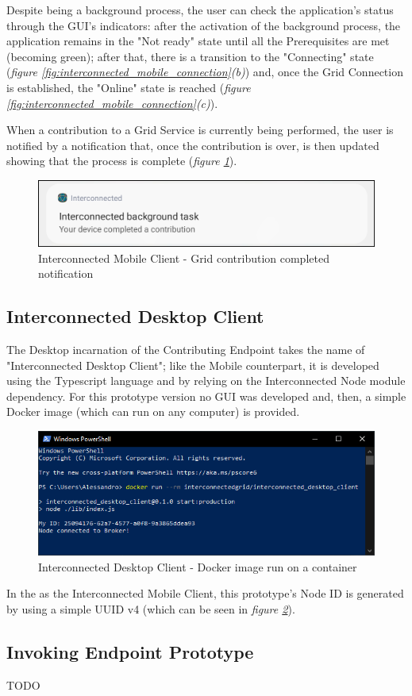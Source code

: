 \vspace{5mm}

Despite being a background process, the user can check the application's status through the GUI's indicators: after the activation of the background process, the application remains in the "Not ready" state until all the Prerequisites are met (becoming green); after that, there is a transition to the "Connecting" state (\textit{figure \ref{fig:interconnected_mobile_connection}(b)}) and, once the Grid Connection is established, the "Online" state is reached (\textit{figure \ref{fig:interconnected_mobile_connection}(c)}).

When a contribution to a Grid Service is currently being performed, the user is notified by a notification that, once the contribution is over, is then updated showing that the process is complete (\textit{figure \ref{fig:notification_completed}}).

\begin{figure}[!ht]
    \centering
    \includegraphics[scale=0.35]{document/chapters/chapter_7/images/notification_completed.png}
    \caption{Interconnected Mobile Client - Grid contribution completed notification}
    \label{fig:notification_completed}
\end{figure}

\subsection{Interconnected Desktop Client}
The Desktop incarnation of the Contributing Endpoint takes the name of "Interconnected Desktop Client"; like the Mobile counterpart, it is developed using the Typescript language and by relying on the Interconnected Node module dependency. For this prototype version no GUI was developed and, then, a simple Docker image (which can run on any computer) is provided.

\begin{figure}[!ht]
    \centering
    \includegraphics[scale=0.8]{document/chapters/chapter_7/images/interconnected_desktop.png}
    \caption{Interconnected Desktop Client - Docker image run on a container}
    \label{fig:interconnected_desktop}
\end{figure}

In the  as the Interconnected Mobile Client, this prototype's Node ID is generated by using a simple UUID v4 (which can be seen in \textit{figure \ref{fig:interconnected_desktop}}).

\subsection{Invoking Endpoint Prototype}
TODO